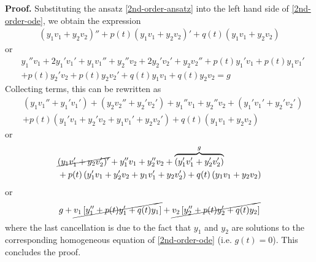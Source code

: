 \documentclass[12pt,reqno]{amsart}
\numberwithin{equation}{section}  %
\numberwithin{figure}{section}
\theoremstyle{plain}
\theoremstyle{definition}
\theoremstyle{remark}
\begin{document}
%
{\bf Proof.} Substituting the ansatz \eqref{2nd-order-ansatz} into
the left hand side of \eqref{2nd-order-ode}, we obtain the expression
%
%
%
%
\begin{equation*}
\begin{split}
  (y_{1}v_{1} + y_{2}v_{2})'' + p(t)(y_{1}v_{1} + y_{2}v_{2})' +
  q(t)(y_{1}v_{1} + y_{2}v_{2}) 
\end{split}
\end{equation*}
%
%
or
%
%
\begin{equation*}
  \begin{split}
    & y_{1}'' v_{1} + 2y_{1}'v_{1}' + y_{1}v_{1}'' + y_{2}''v_{2} + 2y_{2}' v_{2}'
  + y_{2} v_{2}'' + p(t)y_{1}'v_{1} + p(t)y_{1}v_{1}'
  \\
  & + p(t)y_{2}'v_{2} + p(t)y_{2}v_{2}' + q(t)y_{1}v_{1} + q(t)y_{2}v_{2} =g
\end{split}
\end{equation*}
%
Collecting terms, this can be rewritten as
%
%
%
%
\begin{equation*}
\begin{split}
  & (y_{1}v_{1}'' + y_{1}' v_{1}') + (y_{2}v_{2}'' + y_{2}' v_{2}') + y_{1}''
  v_{1} + y_{2}'' v_{2} + (y_{1}'v_{1}' + y_{2}' v_{2}')
  \\
  & + p(t)\left(
  y_{1}'v_{1} + y_{2}' v_{2} + y_{1}v_{1}' + y_{2}v_{2}'
  \right) + q(t)\left( y_{1}v_{1} + y_{2}v_{2} \right)
  \end{split}
\end{equation*}
%
or
%
%
%
%
\begin{equation*}
\begin{split}
  & \cancel{(y_{1}v_{1}' + y_{2}v_{2}')'} + y_{1}''
  v_{1} + y_{2}'' v_{2} + \overbrace{(y_{1}'v_{1}' + y_{2}' v_{2}')}^{g}
  \\
  & + p(t)\left(
  y_{1}'v_{1} + y_{2}' v_{2} + y_{1}v_{1}' + y_{2}v_{2}'
  \right) + q(t)\left( y_{1}v_{1} + y_{2}v_{2} \right)
  \end{split}
\end{equation*}
%
%
or
%
%
\begin{equation*}
\begin{split}
  g + \cancel{v_{1}\left[ y_{1}'' + p(t)y_{1}' + q(t)y_{1} \right]} +
  \cancel{v_{2}\left[ y_{2}'' + p(t)y_{2}' + q(t)y_{2}
  \right]}
\end{split}
\end{equation*}
%
%
where the last cancellation is due to the fact that $y_{1}$ and $y_{2}$ are
solutions to the corresponding homogeneous equation of \eqref{2nd-order-ode}
(i.e. $g(t) = 0$). This concludes the proof. \qquad \qedsymbol
\end{document}
